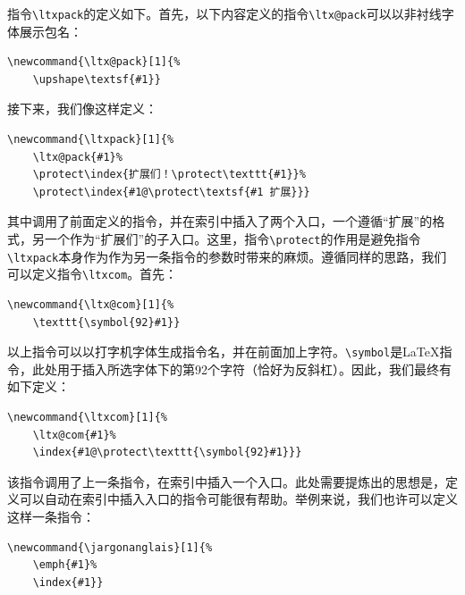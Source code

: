 指令\verb|\ltxpack|的定义如下。首先，以下内容定义的指令\verb|\ltx@pack|可以以非衬线字体展示包名：

\begin{dmd}
\begin{verbatim}
\newcommand{\ltx@pack}[1]{%
    \upshape\textsf{#1}}\end{verbatim}
\end{dmd}

接下来，我们像这样定义：

\begin{dmd}
\begin{verbatim}
\newcommand{\ltxpack}[1]{%
    \ltx@pack{#1}% 
    \protect\index{扩展们！\protect\texttt{#1}}% 
    \protect\index{#1@\protect\textsf{#1 扩展}}}\end{verbatim}
\end{dmd}

其中调用了前面定义的指令，并在索引中插入了两个入口，一个遵循“扩展”的格式，另一个作为“扩展们”的子入口。这里，指令\verb|\protect|的作用是避免指令\verb|\ltxpack|本身作为作为另一条指令的参数时带来的麻烦。遵循同样的思路，我们可以定义指令\verb|\ltxcom|。首先：

\begin{dmd}
\begin{verbatim}
\newcommand{\ltx@com}[1]{%
    \texttt{\symbol{92}#1}}\end{verbatim}
\end{dmd}

以上指令可以以打字机字体生成指令名，并在前面加上字符\dm{\backslash}。\verb|\symbol|是\LaTeX 指令，此处用于插入所选字体下的第92个字符（恰好为反斜杠）。因此，我们最终有如下定义：

\begin{dmd}
\begin{verbatim}
\newcommand{\ltxcom}[1]{%
    \ltx@com{#1}% 
    \index{#1@\protect\texttt{\symbol{92}#1}}}\end{verbatim}
\end{dmd}

该指令调用了上一条指令，在索引中插入一个入口。此处需要提炼出的思想是，定义可以自动在索引中插入入口的指令可能很有帮助。举例来说，我们也许可以定义这样一条指令：

\begin{dmd}
\begin{verbatim}
\newcommand{\jargonanglais}[1]{% 
    \emph{#1}%
    \index{#1}}\end{verbatim}
\end{dmd}

